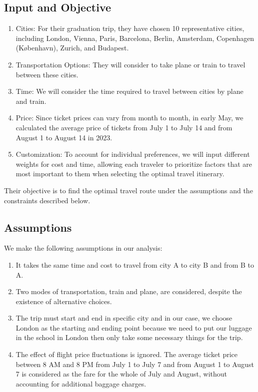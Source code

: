 \documentclass[11pt]{extarticle}
\begin{document}
\subsection{Input and Objective}

\begin{enumerate}
  \item Cities: For their graduation trip, they have chosen 10 representative cities,
        including London, Vienna, Paris, Barcelona, Berlin, Amsterdam, Copenhagen
        (København), Zurich, and Budapest.
  \item Transportation Options: They will consider to take plane or train to travel
        between these cities.
  \item Time: We will consider the time required to travel between cities by plane and
        train.
  \item Price: Since ticket prices can vary from month to month, in early May, we
        calculated the average price of tickets from July 1 to July 14 and from August
        1 to August 14 in 2023.
  \item Customization: To account for individual preferences, we will input different
        weights for cost and time, allowing each traveler to prioritize factors that
        are most important to them when selecting the optimal travel itinerary.
\end{enumerate}

Their objective is to find the optimal travel route under the assumptions and
the constraints described below.

\subsection{Assumptions}

We make the following assumptions in our analysis:

\begin{enumerate}
  \item It takes the same time and cost to travel from city A to city B and from B to
        A.
  \item Two modes of transportation, train and plane, are considered, despite the
        existence of alternative choices.
  \item The trip must start and end in specific city and in our case, we choose London
        as the starting and ending point because we need to put our luggage in the
        school in London then only take some necessary things for the trip.
  \item The effect of flight price fluctuations is ignored. The average ticket price
        between 8 AM and 8 PM from July 1 to July 7 and from August 1 to August 7 is
        considered as the fare for the whole of July and August, without accounting for
        additional baggage charges.
\end{enumerate}
\end{document}

